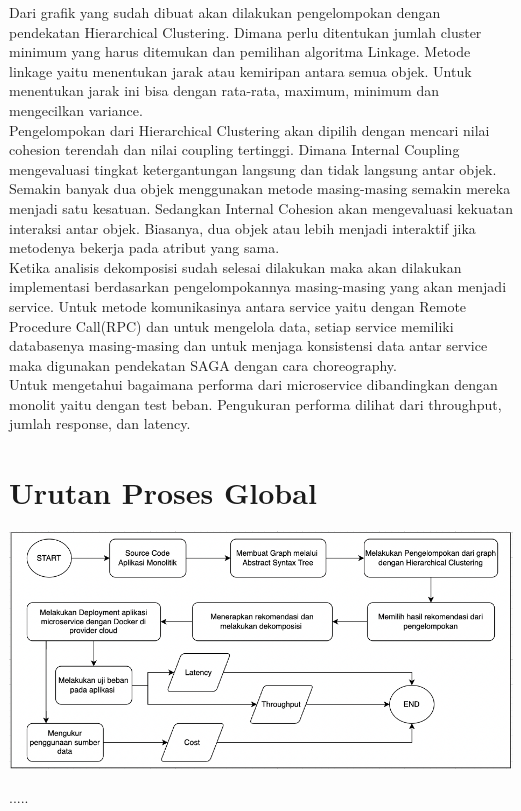 Dari grafik yang sudah dibuat akan dilakukan pengelompokan dengan pendekatan Hierarchical Clustering. Dimana perlu ditentukan jumlah cluster minimum yang harus ditemukan dan pemilihan algoritma Linkage. Metode linkage yaitu menentukan jarak atau kemiripan antara semua objek. Untuk menentukan jarak ini bisa dengan rata-rata, maximum, minimum dan mengecilkan variance. \\

Pengelompokan dari Hierarchical Clustering akan dipilih dengan mencari nilai cohesion terendah dan  nilai coupling tertinggi. Dimana Internal Coupling mengevaluasi tingkat ketergantungan langsung dan tidak langsung antar objek. Semakin banyak dua objek menggunakan metode masing-masing semakin mereka menjadi satu kesatuan. Sedangkan Internal Cohesion akan mengevaluasi kekuatan interaksi antar objek. Biasanya, dua objek atau lebih menjadi interaktif jika metodenya bekerja pada atribut yang sama.\\

Ketika analisis dekomposisi sudah selesai dilakukan maka akan dilakukan implementasi berdasarkan pengelompokannya masing-masing yang akan menjadi service. Untuk metode komunikasinya antara service yaitu dengan Remote Procedure Call(RPC) dan untuk mengelola data, setiap service memiliki databasenya masing-masing dan untuk menjaga konsistensi data antar service maka digunakan pendekatan SAGA dengan cara choreography.\\

Untuk mengetahui bagaimana performa dari microservice dibandingkan dengan monolit yaitu dengan test beban. Pengukuran performa dilihat dari throughput, jumlah response, dan latency. 


\section{Urutan Proses Global}
\begin{center}
	\includegraphics[width=14cm]{img/FlowchartProsesGlobal.png}
	\label{fig:asd}
\end{center}
.....


